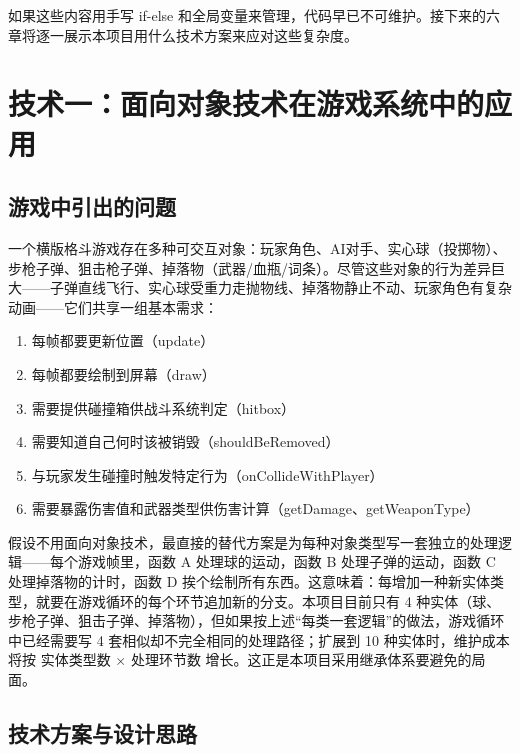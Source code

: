 \documentclass[utf8]{ctexart}
\begin{document}
如果这些内容用手写 if-else 和全局变量来管理，代码早已不可维护。接下来的六章将逐一展示本项目用什么技术方案来应对这些复杂度。

\newpage

\section{技术一：面向对象技术在游戏系统中的应用}

\subsection{游戏中引出的问题}

一个横版格斗游戏存在多种可交互对象：玩家角色、AI对手、实心球（投掷物）、步枪子弹、狙击枪子弹、掉落物（武器/血瓶/词条）。尽管这些对象的行为差异巨大——子弹直线飞行、实心球受重力走抛物线、掉落物静止不动、玩家角色有复杂动画——它们共享一组基本需求：

\begin{enumerate}
  \item 每帧都要更新位置（update）
  \item 每帧都要绘制到屏幕（draw）
  \item 需要提供碰撞箱供战斗系统判定（hitbox）
  \item 需要知道自己何时该被销毁（shouldBeRemoved）
  \item 与玩家发生碰撞时触发特定行为（onCollideWithPlayer）
  \item 需要暴露伤害值和武器类型供伤害计算（getDamage、getWeaponType）
\end{enumerate}

假设不用面向对象技术，最直接的替代方案是为每种对象类型写一套独立的处理逻辑——每个游戏帧里，函数 A 处理球的运动，函数 B 处理子弹的运动，函数 C 处理掉落物的计时，函数 D 挨个绘制所有东西。这意味着：每增加一种新实体类型，就要在游戏循环的每个环节追加新的分支。本项目目前只有 4 种实体（球、步枪子弹、狙击子弹、掉落物），但如果按上述“每类一套逻辑”的做法，游戏循环中已经需要写 4 套相似却不完全相同的处理路径；扩展到 10 种实体时，维护成本将按 实体类型数 $\times$ 处理环节数 增长。这正是本项目采用继承体系要避免的局面。

\subsection{技术方案与设计思路}
\end{document}
